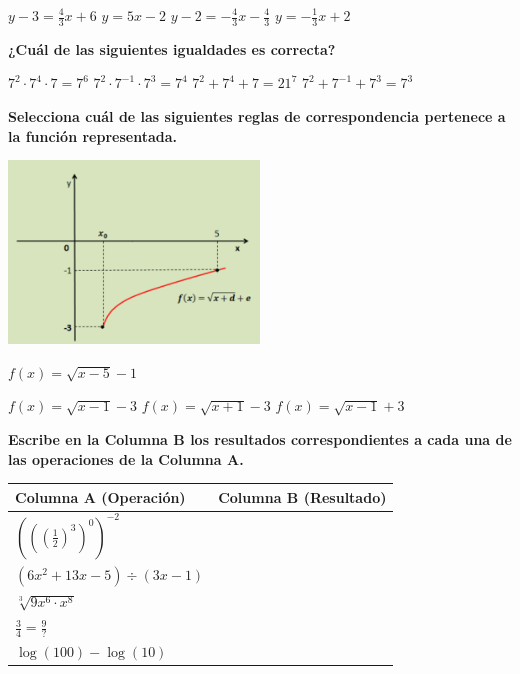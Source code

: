 \documentclass[11pt, addpoints, answers]{exam}
\begin{document}
\begin{questions}
\begin{center}
		\end{center}
		\begin{choices}
			\choice $y-3 = \frac{4}{3}x+6$
			\choice $y = 5x-2$
			\choice $y-2 = -\frac{4}{3}x - \frac{4}{3}$
			\choice $y = -\frac{1}{3}x+2$
		\end{choices}
		
			\vspace{1.5cm}
		
		
		\question[1] \textbf{¿Cuál de las siguientes igualdades es correcta?}
		\begin{checkboxes}
			\choice $7^2 \cdot 7^4 \cdot 7 = 7^6$
			\choice $7^2 \cdot 7^{-1} \cdot 7^3 = 7^4$
			\choice $7^2 + 7^4 + 7 = 21^7$
			\choice $7^2 + 7^{-1} + 7^3 = 7^3$
		\end{checkboxes}
		
		\question[1] \textbf{Selecciona cuál de las siguientes reglas de correspondencia pertenece a la función representada.}
		\begin{center}
			\includegraphics[width=0.5\textwidth]{image_249683.png}
		\end{center}
		\begin{checkboxes}
			\choice $f(x) = \sqrt{x-5}-1$
			
			\choice $f(x) = \sqrt{x-1}-3$
			\choice $f(x) = \sqrt{x+1}-3$
			\choice $f(x) = \sqrt{x-1}+3$
		\end{checkboxes}
		
		\question[1] \textbf{Escribe en la Columna B los resultados correspondientes a cada una de las operaciones de la Columna A.}
		
		
		\begin{tabularx}{\textwidth}{|>{\RaggedRight\arraybackslash}X|X|}
			\hline
			\textbf{Columna A (Operación)} & \textbf{Columna B (Resultado)} \\
			\hline
			$\left(\left(\left(\frac{1}{2}\right)^3\right)^0\right)^{-2}$ & \\
			\hline
			$(6x^2+13x-5) \div (3x-1)$ & \\
			\hline
			$\sqrt[3]{9x^6 \cdot x^8}$ & \\
			\hline
			$\frac{3}{4} = \frac{9}{?}$ & \\
			\hline
			$\log(100) - \log(10)$ & \\
			\hline
		\end{tabularx}
		

\end{questions}
\end{document}
